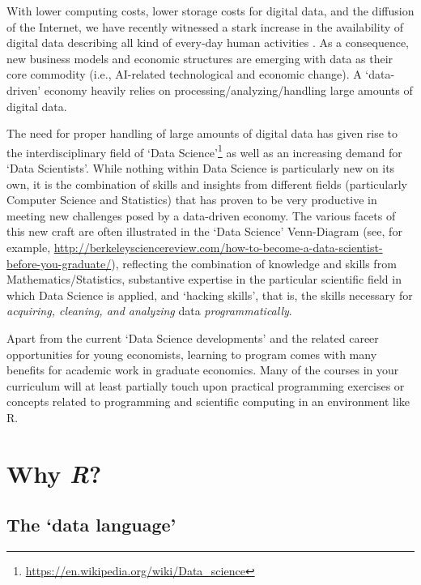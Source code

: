 \documentclass[
  12pt,
]{style/krantz}
\renewcommand{\href}[2]{#2\footnote{\url{#1}}}
\begin{document}
With lower computing costs, lower storage costs for digital data, and the diffusion of the Internet, we have recently witnessed a stark increase in the availability of digital data describing all kind of every-day human activities \citep{einav_levin2014, matter_stutzer2015}. As a consequence, new business models and economic structures are emerging with data as their core commodity (i.e., AI-related technological and economic change). A `data-driven' economy heavily relies on processing/analyzing/handling large amounts of digital data.

The need for proper handling of large amounts of digital data has given rise to the interdisciplinary field of \href{https://en.wikipedia.org/wiki/Data_science}{`Data Science'} as well as an increasing demand for `Data Scientists'. While nothing within Data Science is particularly new on its own, it is the combination of skills and insights from different fields (particularly Computer Science and Statistics) that has proven to be very productive in meeting new challenges posed by a data-driven economy. The various facets of this new craft are often illustrated in the `Data Science' Venn-Diagram (see, for example, \url{http://berkeleysciencereview.com/how-to-become-a-data-scientist-before-you-graduate/}), reflecting the combination of knowledge and skills from Mathematics/Statistics, substantive expertise in the particular scientific field in which Data Science is applied, and `hacking skills', that is, the skills necessary for \emph{acquiring, cleaning, and analyzing} data \emph{programmatically}.

Apart from the current `Data Science developments' and the related career opportunities for young economists, learning to program comes with many benefits for academic work in graduate economics. Many of the courses in your curriculum will at least partially touch upon practical programming exercises or concepts related to programming and scientific computing in an environment like R.

\hypertarget{why-r}{%
\section{\texorpdfstring{Why \emph{R}?}{Why R?}}\label{why-r}}

\hypertarget{the-data-language}{%
\subsection{The `data language'}\label{the-data-language}}
\end{document}
